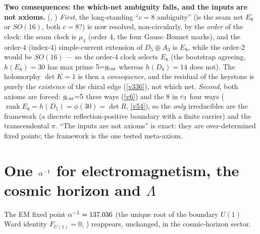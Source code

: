 \par\smallskip\noindent\textbf{Two consequences: the which-net ambiguity falls, and the inputs are not axioms.}
(, )
\emph{First}, the long-standing ``$c{=}8$ ambiguity'' (is the seam net $E_8$ or $SO(16)$, both $c{=}8$?) is now
resolved, non-circularly, by the \emph{order} of the clock: the seam clock is $\mu_4$ (order $4$, the four
Gauss--Bonnet marks), and the order-$4$ (index-$4$) simple-current extension of $D_5\!\oplus\!A_3$ is $E_8$, while
the order-$2$ would be $SO(16)$ --- so the order-$4$ clock selects $E_8$ (the bootstrap agreeing, $h(E_8){=}30$ has
max prime $5{=}g_{\mathrm{car}}$ whereas $h(D_8){=}14$ does not). The holomorphy $\det K{=}1$ is then a \emph{consequence}, and
the residual of the keystone is purely the \emph{existence} of the chiral edge (\vref{v336}), not which net.
\emph{Second}, both axioms are forced: $g_{\mathrm{car}}{=}5$ three ways (\vref{v6}) and the $8$ in $c_3$ four ways
($\operatorname{rank}E_8=h(D_5)=\phi(30)=\det R$, \vref{v54}), so the \emph{only} irreducibles are the framework
(a discrete reflection-positive boundary with a finite carrier) and the transcendental $\pi$. ``The inputs are not
axioms'' is exact: they are over-determined fixed points; the framework is the one tested meta-axiom.

\section{One $\alpha^{-1}$ for electromagnetism, the cosmic horizon and $\Lambda$}\label{sec:alpha}
The EM fixed point $\alpha^{-1}=137.036$ (the unique root of the boundary $U(1)$ Ward identity $F_{U(1)}=0$,
) reappears, unchanged, in the cosmic-horizon sector.

